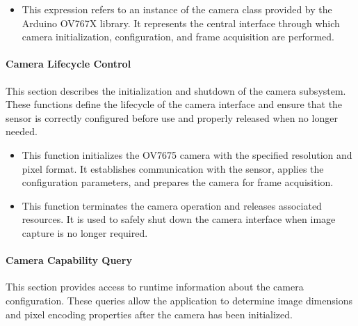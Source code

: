 \begin{itemize}
	\item {} 
	
	This expression refers to an instance of the camera class provided by the Arduino OV767X library. It represents the central interface through which camera initialization, configuration, and frame acquisition are performed.
\end{itemize}


\paragraph{Camera Lifecycle Control}
This section describes the initialization and shutdown of the camera subsystem. These functions define the lifecycle of the camera interface and ensure that the sensor is correctly configured before use and properly released when no longer needed.

\begin{itemize}
	\item {} 
	
	This function initializes the OV7675 camera with the specified resolution and pixel format. It establishes communication with the sensor, applies the configuration parameters, and prepares the camera for frame acquisition.
	
	\item {} 
	
	This function terminates the camera operation and releases associated resources. It is used to safely shut down the camera interface when image capture is no longer required.
\end{itemize}


\paragraph{Camera Capability Query}
This section provides access to runtime information about the camera configuration. These queries allow the application to determine image dimensions and pixel encoding properties after the camera has been initialized.

